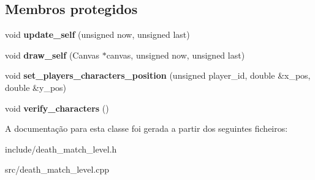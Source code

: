 \subsection*{Membros protegidos}
\begin{DoxyCompactItemize}
\item 
\mbox{\label{classDeathMatchLevel_a104d4fac94d1ce45bb2548ea5467d53e}} 
void {\bfseries update\+\_\+self} (unsigned now, unsigned last)
\item 
\mbox{\label{classDeathMatchLevel_a38a915a954f5c8e8ba54c46057bc99d0}} 
void {\bfseries draw\+\_\+self} (Canvas $\ast$canvas, unsigned now, unsigned last)
\item 
\mbox{\label{classDeathMatchLevel_ab158f20b6f8d51254215553aa713b4cc}} 
void {\bfseries set\+\_\+players\+\_\+characters\+\_\+position} (unsigned player\+\_\+id, double \&x\+\_\+pos, double \&y\+\_\+pos)
\item 
\mbox{\label{classDeathMatchLevel_a5aa8c8eaaba63e222c692581c1f59c1a}} 
void {\bfseries verify\+\_\+characters} ()
\end{DoxyCompactItemize}


A documentação para esta classe foi gerada a partir dos seguintes ficheiros\+:\begin{DoxyCompactItemize}
\item 
include/death\+\_\+match\+\_\+level.\+h\item 
src/death\+\_\+match\+\_\+level.\+cpp\end{DoxyCompactItemize}
